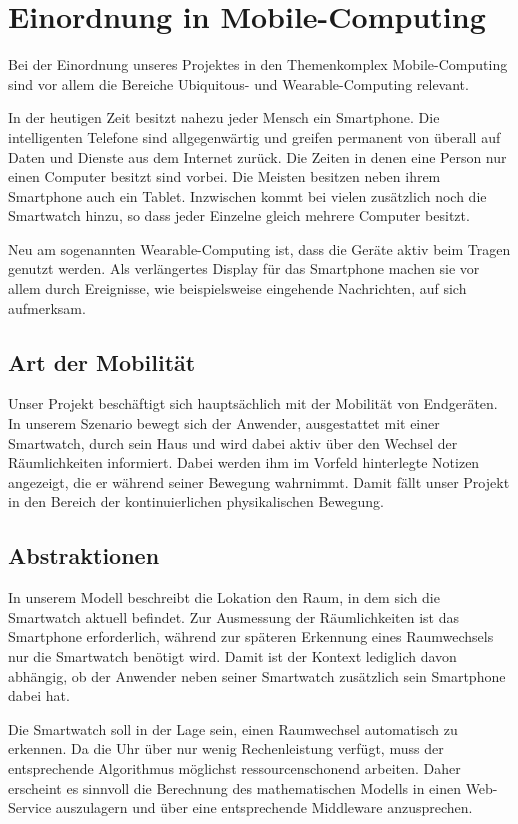 \section{Einordnung in Mobile-Computing}
Bei der Einordnung unseres Projektes in den Themenkomplex Mobile-Computing sind vor allem die Bereiche Ubiquitous- und Wearable-Computing relevant. 

In der heutigen Zeit besitzt nahezu jeder Mensch ein Smartphone. Die intelligenten Telefone sind allgegenwärtig und greifen permanent von überall auf Daten und Dienste aus dem Internet zurück. Die Zeiten in denen eine Person nur einen Computer besitzt sind vorbei. Die Meisten besitzen neben ihrem Smartphone auch ein Tablet. Inzwischen kommt bei vielen zusätzlich noch die Smartwatch hinzu, so dass jeder Einzelne gleich mehrere Computer besitzt.

Neu am sogenannten Wearable-Computing ist, dass die Geräte aktiv beim Tragen genutzt werden. Als verlängertes Display für das Smartphone machen sie vor allem durch Ereignisse, wie beispielsweise eingehende Nachrichten, auf sich aufmerksam. 

\subsection{Art der Mobilität}
Unser Projekt beschäftigt sich hauptsächlich mit der Mobilität von Endgeräten. In unserem Szenario bewegt sich der Anwender, ausgestattet mit einer Smartwatch, durch sein Haus und wird dabei aktiv über den Wechsel der Räumlichkeiten informiert. Dabei werden ihm im Vorfeld hinterlegte Notizen angezeigt, die er während seiner Bewegung wahrnimmt. Damit fällt unser Projekt in den Bereich der kontinuierlichen physikalischen Bewegung.

\subsection{Abstraktionen}
In unserem Modell beschreibt die Lokation den Raum, in dem sich die Smartwatch aktuell befindet. Zur Ausmessung der Räumlichkeiten ist das Smartphone erforderlich, während zur späteren Erkennung eines Raumwechsels nur die Smartwatch benötigt wird. Damit ist der Kontext lediglich davon abhängig, ob der Anwender neben seiner Smartwatch zusätzlich sein Smartphone dabei hat.

Die Smartwatch soll in der Lage sein, einen Raumwechsel automatisch zu erkennen. Da die Uhr über nur wenig Rechenleistung verfügt, muss der entsprechende Algorithmus möglichst ressourcenschonend arbeiten. Daher erscheint es sinnvoll die Berechnung des mathematischen Modells in einen Web-Service auszulagern und über eine entsprechende Middleware anzusprechen.

